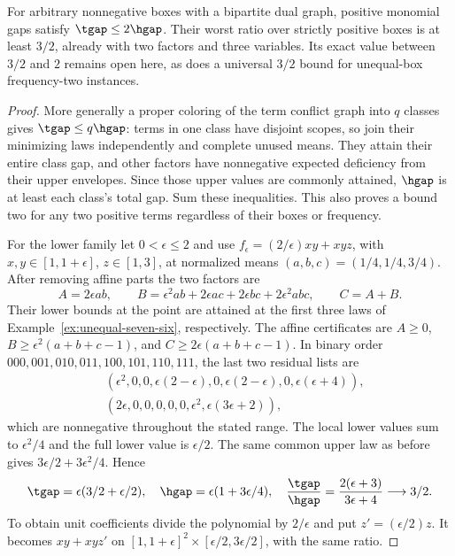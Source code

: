 \begin{proposition}\label{prop:unequal-bipartite}
For arbitrary nonnegative boxes with a bipartite dual graph, positive
monomial gaps satisfy $\tgap\le2\hgap$. Their worst ratio over strictly
positive boxes is at least $3/2$, already with two factors and three
variables. Its exact value between $3/2$ and $2$ remains open here,
as does a universal $3/2$ bound for unequal-box frequency-two instances.
\end{proposition}
\begin{proof}
More generally a proper coloring of the term conflict graph into $q$
classes gives $\tgap\le q\hgap$: terms in one class have disjoint
scopes, so join their minimizing laws independently and complete unused
means. They attain their entire class gap, and other factors have
nonnegative expected deficiency from their upper envelopes. Since those
upper values are commonly attained, $\hgap$ is at least each class's
total gap. Sum these inequalities. This also proves a bound two for
any two positive terms regardless of their boxes or frequency.

For the lower family let $0<\epsilon\le2$ and use
$f_\epsilon=(2/\epsilon)xy+xyz$, with
$x,y\in[1,1+\epsilon]$, $z\in[1,3]$, at normalized means
$(a,b,c)=(1/4,1/4,3/4)$. After removing affine parts the two factors are
\[
 A=2\epsilon ab,\qquad
 B=\epsilon^2ab+2\epsilon ac+2\epsilon bc+2\epsilon^2abc,
 \qquad C=A+B.
\]
Their lower bounds at the point are attained at the first three laws
of Example~\ref{ex:unequal-seven-six}, respectively. The affine
certificates are $A\ge0$, $B\ge\epsilon^2(a+b+c-1)$, and
$C\ge2\epsilon(a+b+c-1)$. In binary order
$000,001,010,011,100,101,110,111$, the last two residual lists are
\[
 \begin{split}
 &(\epsilon^2,0,0,\epsilon(2-\epsilon),0,
                  \epsilon(2-\epsilon),0,\epsilon(\epsilon+4)),\\
 &(2\epsilon,0,0,0,0,0,\epsilon^2,\epsilon(3\epsilon+2)),
 \end{split}
\]
which are nonnegative throughout the stated range. The local lower
values sum to $\epsilon^2/4$ and the full lower value is $\epsilon/2$.
The same common upper law as before gives $3\epsilon/2+3\epsilon^2/4$.
Hence
\[
 \tgap=\epsilon(3/2+\epsilon/2),\quad
 \hgap=\epsilon(1+3\epsilon/4),\quad
 \frac{\tgap}{\hgap}=\frac{2(\epsilon+3)}{3\epsilon+4}\longrightarrow3/2.
\]
To obtain unit coefficients divide the polynomial by $2/\epsilon$ and
put $z'=(\epsilon/2)z$. It becomes $xy+xyz'$ on
$[1,1+\epsilon]^2\times[\epsilon/2,3\epsilon/2]$, with the same ratio.
\end{proof}
